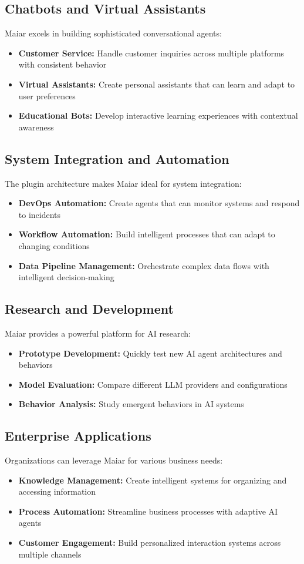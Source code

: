 \documentclass[12pt]{article}
\begin{document}
\subsection{Chatbots and Virtual Assistants}
Maiar excels in building sophisticated conversational agents:
\begin{itemize}
    \item \textbf{Customer Service:} Handle customer inquiries across multiple platforms with consistent behavior
    \item \textbf{Virtual Assistants:} Create personal assistants that can learn and adapt to user preferences
    \item \textbf{Educational Bots:} Develop interactive learning experiences with contextual awareness
\end{itemize}

\subsection{System Integration and Automation}
The plugin architecture makes Maiar ideal for system integration:
\begin{itemize}
    \item \textbf{DevOps Automation:} Create agents that can monitor systems and respond to incidents
    \item \textbf{Workflow Automation:} Build intelligent processes that can adapt to changing conditions
    \item \textbf{Data Pipeline Management:} Orchestrate complex data flows with intelligent decision-making
\end{itemize}

\subsection{Research and Development}
Maiar provides a powerful platform for AI research:
\begin{itemize}
    \item \textbf{Prototype Development:} Quickly test new AI agent architectures and behaviors
    \item \textbf{Model Evaluation:} Compare different LLM providers and configurations
    \item \textbf{Behavior Analysis:} Study emergent behaviors in AI systems
\end{itemize}

\subsection{Enterprise Applications}
Organizations can leverage Maiar for various business needs:
\begin{itemize}
    \item \textbf{Knowledge Management:} Create intelligent systems for organizing and accessing information
    \item \textbf{Process Automation:} Streamline business processes with adaptive AI agents
    \item \textbf{Customer Engagement:} Build personalized interaction systems across multiple channels
\end{itemize}
\end{document}
